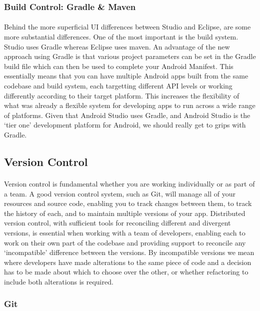 \documentclass[12pt, a4paper, twoside]{book}
\begin{document}
\subsubsection{Build Control: Gradle \& Maven}
\paragraph{} Behind the more superficial UI differences between Studio and Eclipse, are some more substantial differences. One of the most important is the build system. Studio uses Gradle whereas Eclipse uses maven. An advantage of the new approach using Gradle is that various project parameters can be set in the Gradle build file which can then be used to complete your Android Manifest. This essentially means that you can have multiple Android apps built from the same codebase and build system, each targetting different API levels or working differently according to their target platform. This increases the flexibility of what was already a flexible system for developing apps to run across a wide range of platforms. Given that Android Studio uses Gradle, and Android Studio is the `tier one' development platform for Android, we should really get to grips with Gradle.

\subsection{Version Control}
\paragraph{} Version control is fundamental whether you are working individually or as part of a team. A good version control system, such as Git, will manage all of your resources and source code, enabling you to track changes between them, to track the history of each, and to maintain multiple versions of your app. Distributed version control, with sufficient tools for reconciling different and divergent versions, is essential when working with a team of developers, enabling each to work on their own part of the codebase and providing support to reconcile any `incompatible' difference between the versions. By incompatible versions we mean where developers have made alterations to the same piece of code and a decision has to be made about which to choose over the other, or whether refactoring to include both alterations is required. 

\subsubsection{Git}
\end{document}
